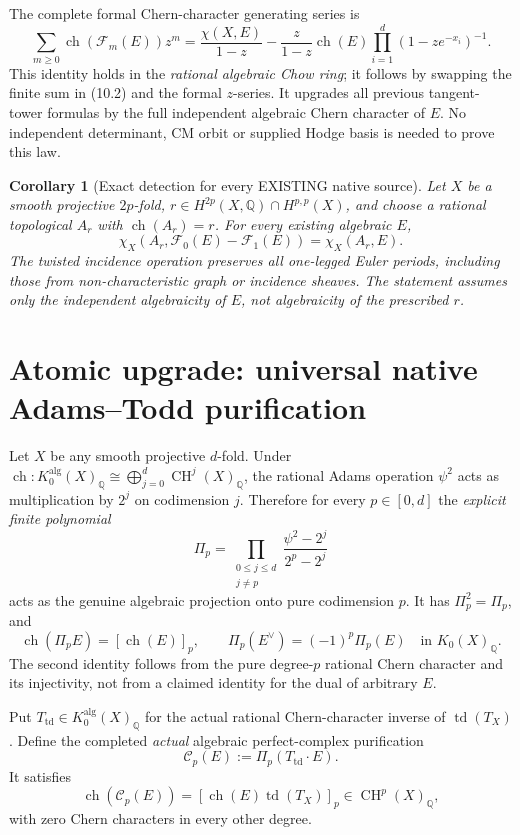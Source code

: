 \documentclass[11pt]{article}
\newcommand{\Q}{\mathbb Q}
\newcommand{\CH}{\operatorname{CH}}
\newcommand{\ch}{\operatorname{ch}}
\newcommand{\td}{\operatorname{td}}
\newtheorem{corollary}[theorem]{Corollary}
\begin{document}
The complete formal Chern-character generating series is
\[
 \boxed{
 \sum_{m\ge0}\ch(\mathcal F_m(E))z^m
   =\frac{\chi(X,E)}{1-z}
   -\frac{z}{1-z}\ch(E)
           \prod_{i=1}^{d}(1-ze^{-x_i})^{-1}.
 }                                                       \tag{10.4}
\]
This identity holds in the \emph{rational algebraic Chow ring};
it follows by swapping the finite sum in (10.2) and the
formal \(z\)-series. It upgrades all previous tangent-tower
formulas by the full independent algebraic Chern character
of \(E\). No independent determinant, CM orbit or supplied
Hodge basis is needed to prove this law.

\begin{corollary}[Exact detection for every EXISTING native source]
Let \(X\) be a smooth projective \(2p\)-fold,
\(r\in H^{2p}(X,\Q)\cap H^{p,p}(X)\), and choose a
rational topological \(A_r\) with \(\ch(A_r)=r\).
For every existing algebraic \(E\),
\[
 \boxed{
 \chi_X(A_r,\mathcal F_0(E)-\mathcal F_1(E))
       =\chi_X(A_r,E).}                             \tag{10.5}
\]
The twisted incidence operation preserves all one-legged
Euler periods, including those from non-characteristic
graph or incidence sheaves. The statement assumes
\emph{only the independent algebraicity of \(E\)},
not algebraicity of the prescribed \(r\).
\end{corollary}

\section{Atomic upgrade: universal native Adams--Todd purification}
Let \(X\) be any smooth projective \(d\)-fold. Under
\(\ch:K_0^{\mathrm{alg}}(X)_\Q\cong
\bigoplus_{j=0}^{d}\CH^j(X)_\Q\), the rational Adams
operation \(\psi^2\) acts as multiplication by \(2^j\)
on codimension \(j\). Therefore for every \(p\in[0,d]\)
the \emph{explicit finite polynomial}
\[
 \boxed{
 \Pi_p=\prod_{\substack{0\le j\le d\\j\ne p}}
       \frac{\psi^2-2^j}{2^p-2^j}}
                                                               \tag{11.1}
\]
acts as the genuine algebraic projection onto pure
codimension \(p\). It has \(\Pi_p^2=\Pi_p\), and
\[
 \ch(\Pi_p E)=[\ch(E)]_p,\qquad
 \Pi_p(E^\vee)=(-1)^p\Pi_p(E)
 \quad\text{in }K_0(X)_\Q.                          \tag{11.2}
\]
The second identity follows from the pure degree-\(p\)
rational Chern character and its injectivity, not from
a claimed identity for the dual of arbitrary \(E\).

Put \(T_{\td}\in K_0^{\mathrm{alg}}(X)_\Q\)
for the actual rational Chern-character inverse of
\(\td(T_X)\). Define the completed \emph{actual}
algebraic perfect-complex purification
\[
 \boxed{\mathcal C_p(E)
     :=\Pi_p(T_{\td}\cdot E).}                       \tag{11.3}
\]
It satisfies
\[
 \ch(\mathcal C_p(E))
     =[\ch(E)\td(T_X)]_p
       \in\CH^p(X)_\Q,                              \tag{11.4}
\]
with zero Chern characters in every other degree.
\end{document}
